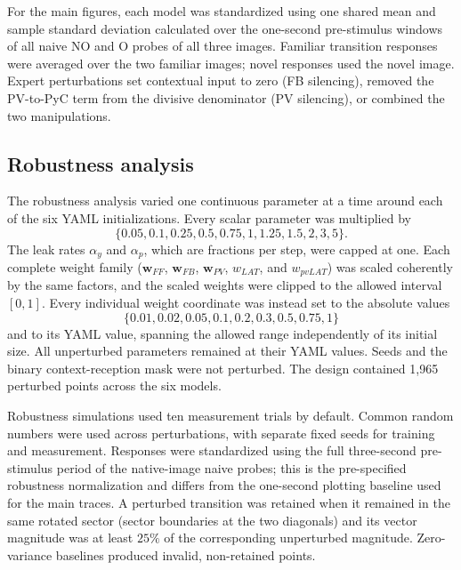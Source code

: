 For the main figures, each model was standardized using one shared mean and
sample standard deviation calculated over the one-second pre-stimulus windows
of all naive NO and O probes of all three images.  Familiar transition responses
were averaged over the two familiar images; novel responses used the novel
image.  Expert perturbations set contextual input to zero (FB silencing), removed
the PV-to-PyC term from the divisive denominator (PV silencing), or combined the
two manipulations.

\subsection{Robustness analysis}
The robustness analysis varied one continuous parameter at a time around each
of the six YAML initializations.  Every scalar parameter was multiplied by
\begin{equation}
 \{0.05,0.1,0.25,0.5,0.75,1,1.25,1.5,2,3,5\}.
\end{equation}
The leak rates $\alpha_y$ and $\alpha_p$, which are fractions per step, were
capped at one.  Each complete weight family ($\mathbf{w}_{FF}$,
$\mathbf{w}_{FB}$, $\mathbf{w}_{PV}$, $w_{LAT}$, and $w_{pvLAT}$) was scaled
coherently by the same factors, and the scaled weights were clipped to the
allowed interval $[0,1]$.  Every individual weight coordinate was instead set
to the absolute values
\begin{equation}
 \{0.01,0.02,0.05,0.1,0.2,0.3,0.5,0.75,1\}
\end{equation}
and to its YAML value, spanning the allowed range independently of its initial
size.  All unperturbed parameters remained at their YAML values.  Seeds and the
binary context-reception mask were not perturbed.  The design contained 1,965
perturbed points across the six models.

Robustness simulations used ten measurement trials by default.  Common random
numbers were used across perturbations, with separate fixed seeds for training
and measurement.  Responses were standardized using the full three-second
pre-stimulus period of the native-image naive probes; this is the pre-specified
robustness normalization and differs from the one-second plotting baseline used
for the main traces.  A perturbed transition was retained when it remained in
the same rotated sector (sector boundaries at the two diagonals) and its vector
magnitude was at least $25\%$ of the corresponding unperturbed magnitude.
Zero-variance baselines produced invalid, non-retained points.

